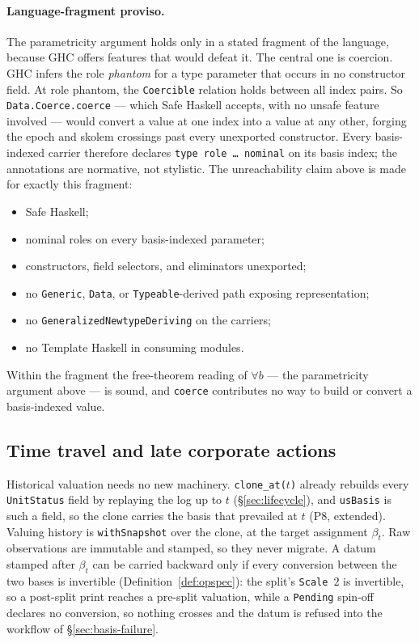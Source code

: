 \paragraph{Language-fragment proviso.} The parametricity argument holds only in
a stated fragment of the language, because GHC offers features that would
defeat it. The central one is coercion. GHC infers the role \emph{phantom} for a type
parameter that occurs in no constructor field. At role phantom, the
\texttt{Coercible} relation holds between all index pairs. So
\texttt{Data.Coerce.coerce} --- which Safe Haskell accepts, with no unsafe feature
involved --- would convert a value at one index into a value at any other, forging
the epoch and skolem crossings past every unexported constructor. Every
basis-indexed carrier therefore declares \texttt{type role \dots\ nominal} on
its basis index; the annotations are normative, not stylistic. The
unreachability claim above is made for exactly this fragment:
\begin{itemize}[nosep]
\item Safe Haskell;
\item nominal roles on every basis-indexed parameter;
\item constructors, field selectors, and eliminators unexported;
\item no \texttt{Generic}, \texttt{Data}, or \texttt{Typeable}-derived path exposing
representation;
\item no \texttt{GeneralizedNewtypeDeriving} on the carriers;
\item no Template Haskell in consuming modules.
\end{itemize}
Within the fragment the free-theorem reading of $\forall b$ --- the
parametricity argument above --- is sound, and \texttt{coerce} contributes no
way to build or convert a basis-indexed value.

\subsection{Time travel and late corporate actions}
\label{sec:basis-time-travel}

Historical valuation needs no new machinery. \texttt{clone\_at($t$)} already rebuilds
every \texttt{UnitStatus} field by replaying the log up to $t$ (\S\ref{sec:lifecycle}),
and \texttt{usBasis} is such a field, so the clone carries the basis that prevailed at
$t$ (P8, extended). Valuing history is \texttt{withSnapshot} over the clone, at the
target assignment $\beta_t$. Raw observations are immutable and stamped, so they never
migrate. A datum stamped after $\beta_t$ can be carried backward only if every
conversion between the two bases is invertible (Definition~\ref{def:opspec}): the
split's \texttt{Scale}~$2$ is invertible, so a post-split print
reaches a pre-split valuation, while a \texttt{Pending} spin-off declares no conversion,
so nothing crosses and the datum is refused into the workflow of
\S\ref{sec:basis-failure}.


